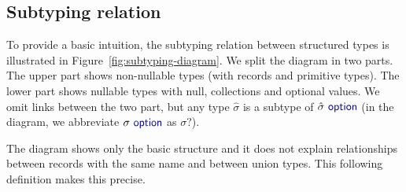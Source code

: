 \documentclass[preprint]{sigplanconf}
\newcommand{\kvd}[1]{\textnormal{\textcolor{kvdclr}{\sffamily #1}}}
\begin{document}


\subsection{Subtyping relation}
\label{sec:inference-subtyping}

To provide a basic intuition, the subtyping relation between structured types is illustrated in
Figure~\ref{fig:subtyping-diagram}. We split the diagram in two parts. The upper part shows 
non-nullable types (with records and primitive types). The lower part shows nullable types with 
\kvd{null}, collections and optional values. We omit links between the two part, but any type
$\hat{\sigma}$ is a subtype of $\hat{\sigma}~\kvd{option}$ (in the diagram, we abbreviate 
$\sigma~\kvd{option}$ as $\sigma?$).

The diagram shows only the basic structure and it does not explain relationships between records
with the same name and between union types. This following definition makes this precise.
\end{document}

